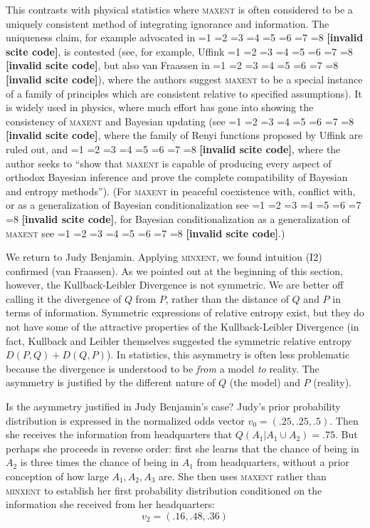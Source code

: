 \documentclass[11pt]{article}
\newcommand{\qeins}[1]{``#1''}
\newif\ifNumericalOrYear
\newcommand{\PageP}{p.~}
\newcommand{\PageP}{}
\newcommand{\scite}[3]{\ifnum#1=1\ifNumericalOrYear\citep{#2}\else\citeyearpar{#2}\fi\else
\ifnum#1=2\ifNumericalOrYear\citep[#3]{#2}\else\citep[{\PageP}#3]{#2}\fi\else
\ifnum#1=3\ifNumericalOrYear(\citet[#3]{#2})\else\citep[{\PageP}#3]{#2}\fi\else
\ifnum#1=4\ifNumericalOrYear\citet{#2}\else\citet{#2}\fi\else
\ifnum#1=5\ifNumericalOrYear(\citet{#2})\else\citep{#2}\fi\else
\ifnum#1=6\ifNumericalOrYear(\citet[#3]{#2})\else\citep[{\PageP}#3]{#2}\fi\else
\ifnum#1=7\ifNumericalOrYear\citep{#2}\else\citealp{#2}\fi\else
\ifnum#1=8\ifNumericalOrYear\citep[#3]{#2}\else\citealp[{\PageP}#3]{#2}\fi\else
\textbf{[invalid scite code]}\fi\fi\fi\fi\fi\fi\fi\fi}
\begin{document}
This contrasts with physical statistics where \textsc{maxent} is often
considered to be a uniquely consistent method of integrating ignorance
and information. The uniqueness claim, for example advocated in
\scite{4}{shorejohnson80}{}, is contested (see, for example, Uffink
\scite{7}{uffink95}{}, but also van Fraassen in
\scite{7}{fraassenetal86}{}), where the authors suggest
\textsc{maxent} to be a special instance of a family of principles
which are consistent relative to specified assumptions). It is widely
used in physics, where much effort has gone into showing the
consistency of \textsc{maxent} and Bayesian updating (see
\scite{7}{catichagiffin06}{}, where the family of Renyi functions
proposed by Uffink are ruled out, and \scite{7}{giffin08}{}, where the
author seeks to \qeins{show that \textsc{maxent} is capable of
  producing every aspect of orthodox Bayesian inference and prove the
  complete compatibility of Bayesian and entropy methods}). (For
\textsc{maxent} in peaceful coexistence with, conflict with, or as a
generalization of Bayesian conditionalization see
\scite{7}{uffink96}{}, for Bayesian conditionalization as a
generalization of \textsc{maxent} see \scite{7}{skyrms85}{}.)

We return to Judy Benjamin. Applying \textsc{minxent}, we found
intuition (I2) confirmed (van Fraassen). As we pointed out at the
beginning of this section, however, the Kullback-Leibler Divergence is
not symmetric. We are better off calling it the divergence of $Q$ from
$P$, rather than the distance of $Q$ and $P$ in terms of information.
Symmetric expressions of relative entropy exist, but they do not have
some of the attractive properties of the Kullback-Leibler Divergence
(in fact, Kullback and Leibler themselves suggested the symmetric
relative entropy $D(P,Q)+D(Q,P)$). In statistics, this asymmetry is
often less problematic because the divergence is understood to be
\emph{from} a model \emph{to} reality. The asymmetry is justified by
the different nature of $Q$ (the model) and $P$ (reality).

Is the asymmetry justified in Judy Benjamin's case? Judy's prior
probability distribution is expressed in the normalized odds vector
$v_{0}=(.25,.25,.5)$. Then she receives the information from
headquarters that $Q(A_{1}|A_{1}\cup{}A_{2})=.75$. But perhaps she
proceeds in reverse order: first she learns that the chance of being
in $A_{2}$ is three times the chance of being in $A_{1}$ from
headquarters, without a prior conception of how large
$A_{1},A_{2},A_{3}$ are. She then uses \textsc{maxent} rather than
\textsc{minxent} to establish her first probability distribution
conditioned on the information she received from her headquarters:
\begin{equation}
  \label{eq:maxentjudy}
  v_{2}=(.16,.48,.36)
\end{equation}
\end{document}
